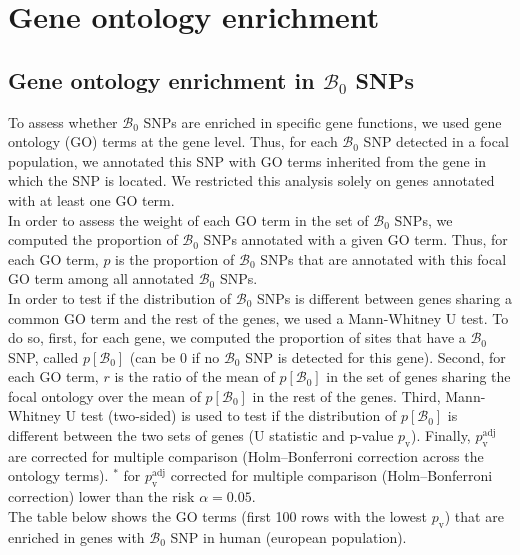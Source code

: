 \documentclass{article}
\newcommand{\SphyBen}{\mathcal{B}_0}
\begin{document}
    \newpage
    \section{Gene ontology enrichment}

    \subsection{Gene ontology enrichment in $\SphyBen$ SNPs}

    To assess whether $\SphyBen$ SNPs are enriched in specific gene functions, we used gene ontology (GO) terms at the gene level.
    Thus, for each $\SphyBen$ SNP detected in a focal population, we annotated this SNP with GO terms inherited from the gene in which the SNP is located.
    We restricted this analysis solely on genes annotated with at least one GO term. \\

    In order to assess the weight of each GO term in the set of $\SphyBen$ SNPs, we computed the proportion of $\SphyBen$ SNPs annotated with a given GO term.
    Thus, for each GO term, $p$ is the proportion of $\SphyBen$ SNPs that are annotated with this focal GO term among all annotated $\SphyBen$ SNPs.\\

    In order to test if the distribution of $\SphyBen$ SNPs is different between genes sharing a common GO term and the rest of the genes, we used a Mann-Whitney U test.
    To do so, first, for each gene, we computed the proportion of sites that have a $\SphyBen$ SNP, called $p[ \SphyBen ]$ (can be 0 if no $\SphyBen$ SNP is detected for this gene).
    Second, for each GO term, $r$ is the ratio of the mean of $p[ \SphyBen ]$ in the set of genes sharing the focal ontology over the mean of $p[ \SphyBen ]$ in the rest of the genes.
    Third, Mann-Whitney U test (two-sided) is used to test if the distribution of $p[ \SphyBen ]$ is different between the two sets of genes (U statistic and p-value $p_{\mathrm{v}}$).
    Finally, $p_{\mathrm{v}}^{\mathrm{adj}}$ are corrected for multiple comparison (Holm–Bonferroni correction across the ontology terms).
    $^*$ for $p_{\mathrm{v}}^{\mathrm{adj}}$ corrected for multiple comparison (Holm–Bonferroni correction) lower than the risk $\alpha=0.05$. \\

    The table below shows the GO terms (first 100 rows with the lowest $p_{\mathrm{v}}$) that are enriched in genes with $\SphyBen$ SNP in human (european population).
\end{document}
